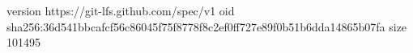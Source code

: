 version https://git-lfs.github.com/spec/v1
oid sha256:36d541bbcafcf56c86045f75f8778f8c2ef0ff727e89f0b51b6dda14865b07fa
size 101495
